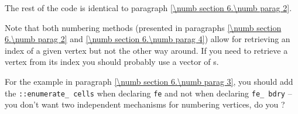 The rest of the code is identical to paragraph \ref{\numb section 6.\numb parag 2}.

Note that both numbering methods (presented in paragraphs \ref{\numb section 6.\numb parag 2}
and \ref{\numb section 6.\numb parag 4}) allow for retrieving
an index of a given vertex but not the other way around.
If you need to retrieve a vertex from its index you should probably use 
a vector of {\small\tt{}}s.

For the example in paragraph \ref{\numb section 6.\numb parag 3}, you should add the
{\small\tt{}::enumerate\_\,cells} when declaring {\small\tt fe} and not when
declaring {\small\tt fe\_\,bdry} -- you don't want two independent mechanisms for numbering
vertices, do you ?
